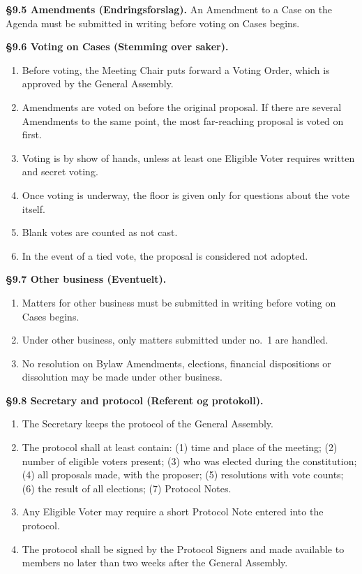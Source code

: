\documentclass{../../../Common/Latex/Templates/rapport}
\begin{document}
\textbf{\S 9.5 Amendments (Endringsforslag).} An Amendment to a Case on the Agenda must be submitted in writing before voting on Cases begins.

\textbf{\S 9.6 Voting on Cases (Stemming over saker).}
\begin{enumerate}
  \item Before voting, the Meeting Chair puts forward a Voting Order, which is approved by the General Assembly.
  \item Amendments are voted on before the original proposal. If there are several Amendments to the same point, the most far-reaching proposal is voted on first.
  \item Voting is by show of hands, unless at least one Eligible Voter requires written and secret voting.
  \item Once voting is underway, the floor is given only for questions about the vote itself.
  \item Blank votes are counted as not cast.
  \item In the event of a tied vote, the proposal is considered not adopted.
\end{enumerate}

\textbf{\S 9.7 Other business (Eventuelt).}
\begin{enumerate}
  \item Matters for other business must be submitted in writing before voting on Cases begins.
  \item Under other business, only matters submitted under no.\ 1 are handled.
  \item No resolution on Bylaw Amendments, elections, financial dispositions or dissolution may be made under other business.
\end{enumerate}

\textbf{\S 9.8 Secretary and protocol (Referent og protokoll).}
\begin{enumerate}
  \item The Secretary keeps the protocol of the General Assembly.
  \item The protocol shall at least contain: (1) time and place of the meeting; (2) number of eligible voters present; (3) who was elected during the constitution; (4) all proposals made, with the proposer; (5) resolutions with vote counts; (6) the result of all elections; (7) Protocol Notes.
  \item Any Eligible Voter may require a short Protocol Note entered into the protocol.
  \item The protocol shall be signed by the Protocol Signers and made available to members no later than two weeks after the General Assembly.
\end{enumerate}
\end{document}
